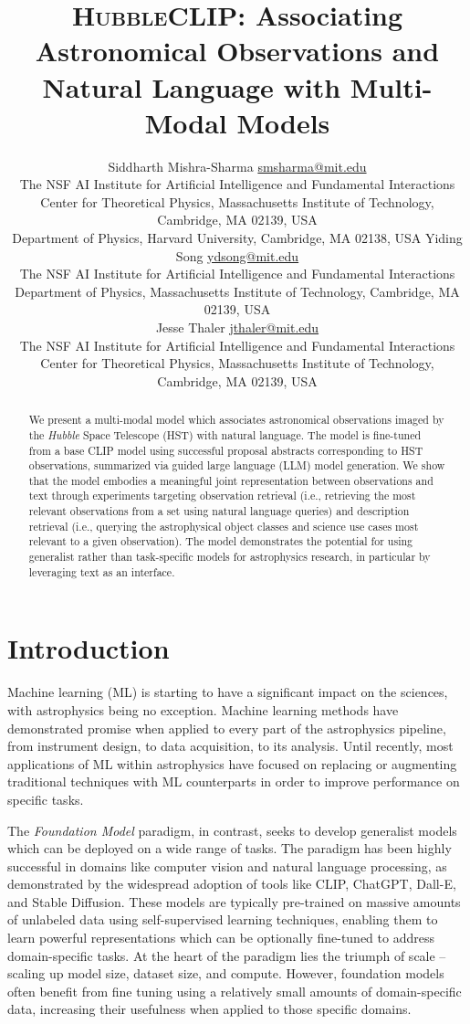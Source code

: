 \documentclass[10pt]{article} %
\title{\textsc{HubbleCLIP}: Associating Astronomical Observations and Natural Language with Multi-Modal Models}
\author{\name Siddharth Mishra-Sharma \email \href{mailto:smsharma@mit.edu}{smsharma@mit.edu} \\
      \addr The NSF AI Institute for Artificial Intelligence and Fundamental Interactions\\
      Center for Theoretical Physics, Massachusetts Institute of Technology, Cambridge, MA 02139, USA \\
      Department of Physics, Harvard University, Cambridge, MA 02138, USA
      \AND
      \name Yiding Song \email \href{mailto:ydsong@mit.edu}{ydsong@mit.edu} \\
      \addr The NSF AI Institute for Artificial Intelligence and Fundamental Interactions\\
      Department of Physics, Massachusetts Institute of Technology, Cambridge, MA 02139, USA \\
      \AND
      \name Jesse Thaler \email \href{mailto:jthaler@mit.edu}{jthaler@mit.edu} \\
      \addr The NSF AI Institute for Artificial Intelligence and Fundamental Interactions\\
      Center for Theoretical Physics, Massachusetts Institute of Technology, Cambridge, MA 02139, USA \\
}
\newcommand{\hubble}{\emph{Hubble}\xspace}
\begin{document}
\maketitle

\thispagestyle{firstpage}

\begin{abstract}
We present a multi-modal model which associates astronomical observations imaged by the \hubble Space Telescope (HST) with natural language. The model is fine-tuned from a base CLIP model using successful proposal abstracts corresponding to HST observations, summarized via guided large language (LLM) model generation. We show that the model embodies a meaningful joint representation between observations and text through experiments targeting observation retrieval (i.e., retrieving the most relevant observations from a set using natural language queries) and description retrieval (i.e., querying the astrophysical object classes and science use cases most relevant to a given observation). The model demonstrates the potential for using generalist rather than task-specific models for astrophysics research, in particular by leveraging text as an interface.
\end{abstract}

\section{Introduction}
\label{sec:intro}

Machine learning (ML) is starting to have a significant impact on the sciences, with astrophysics being no exception. Machine learning methods have demonstrated promise when applied to every part of the astrophysics pipeline, from instrument design, to data acquisition, to its analysis. Until recently, most applications of ML within astrophysics have focused on replacing or augmenting traditional techniques with ML counterparts in order to improve performance on specific tasks.

The \emph{Foundation Model} paradigm, in contrast, seeks to develop generalist models which can be deployed on a wide range of tasks. The paradigm has been highly successful in domains like computer vision and natural language processing, as demonstrated by the widespread adoption of tools like CLIP, ChatGPT, Dall-E, and Stable Diffusion. These models are typically pre-trained on massive amounts of unlabeled data using self-supervised learning techniques, enabling them to learn powerful representations which can be optionally fine-tuned to address domain-specific tasks. At the heart of the paradigm lies the triumph of scale -- scaling up model size, dataset size, and compute. However, foundation models often benefit from fine tuning using a relatively small amounts of domain-specific data, increasing their usefulness when applied to those specific domains.
\end{document}
